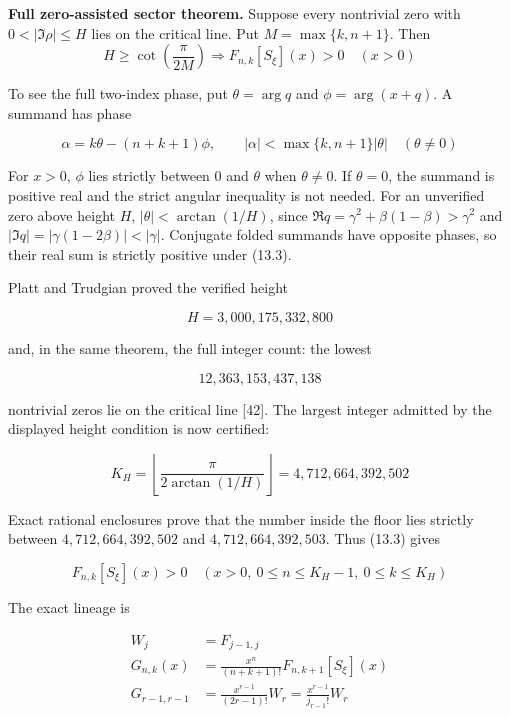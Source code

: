 \documentclass[
  11pt,
]{book}
\renewenvironment{quote}
  {\begin{tcolorbox}[
      enhanced,
      breakable,
      colback=tncream,
      colframe=tnrust,
      boxrule=0.8pt,
      arc=1.5pt,
      left=7pt,
      right=7pt,
      top=6pt,
      bottom=6pt]}
  {\end{tcolorbox}}
\begin{document}
\begin{quote}
\textbf{Full zero-assisted sector theorem.} Suppose every nontrivial
zero with \(0<|\Im\rho|\le H\) lies on the critical line. Put
\(M=\max\{k,n+1\}\). Then \[
\boxed{
H\ge\cot\!\left(\frac{\pi}{2M}\right)
\Longrightarrow F_{n,k}[S_\xi](x)>0\quad(x>0)}
\tag{13.3}
\]
\end{quote}

To see the full two-index phase, put \(\theta=\arg q\) and
\(\phi=\arg(x+q)\). A summand has phase

\[
\alpha=k\theta-(n+k+1)\phi,\qquad
|\alpha|<\max\{k,n+1\}|\theta|\quad(\theta\ne0)
\tag{13.3a}
\]

For \(x>0\), \(\phi\) lies strictly between \(0\) and \(\theta\) when
\(\theta\ne0\). If \(\theta=0\), the summand is positive real and the
strict angular inequality is not needed. For an unverified zero above
height \(H\), \(|\theta|<\arctan(1/H)\), since
\(\Re q=\gamma^2+\beta(1-\beta)>\gamma^2\) and
\(|\Im q|=|\gamma(1-2\beta)|<|\gamma|\). Conjugate folded summands have
opposite phases, so their real sum is strictly positive under (13.3).

Platt and Trudgian proved the verified height

\[
H=3{,}000{,}175{,}332{,}800
\tag{13.4}
\]

and, in the same theorem, the full integer count: the lowest

\[
\boxed{12{,}363{,}153{,}437{,}138}
\tag{13.5}
\]

nontrivial zeros lie on the critical line {[}42{]}. The largest integer
admitted by the displayed height condition is now certified:

\[
\boxed{K_H=\left\lfloor\frac{\pi}{2\arctan(1/H)}\right\rfloor
=4{,}712{,}664{,}392{,}502}
\tag{13.6}
\]

Exact rational enclosures prove that the number inside the floor lies
strictly between \(4{,}712{,}664{,}392{,}502\) and
\(4{,}712{,}664{,}392{,}503\). Thus (13.3) gives

\[
\boxed{
F_{n,k}[S_\xi](x)>0
\quad
(x>0,\ 0\le n\le K_H-1,\ 0\le k\le K_H)}
\tag{13.7}
\]

The exact lineage is

\[
\boxed{\begin{aligned}
W_j&=F_{j-1,j}\\
G_{n,k}(x)&=\frac{x^n}{(n+k+1)!}F_{n,k+1}[S_\xi](x)\\
G_{r-1,r-1}&=\frac{x^{r-1}}{(2r-1)!}W_r
=\frac{x^{r-1}}{j_{r-1}!}W_r
\end{aligned}}
\tag{13.8}
\]
\end{document}
